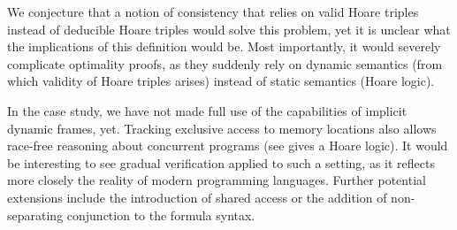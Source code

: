 We conjecture that a notion of consistency that relies on valid Hoare triples instead of deducible Hoare triples would solve this problem, yet it is unclear what the implications of this definition would be.
Most importantly, it would severely complicate optimality proofs, as they suddenly rely on dynamic semantics (from which validity of Hoare triples arises) instead of static semantics (Hoare logic).

In the case study, we have not made full use of the capabilities of implicit dynamic frames, yet.
Tracking exclusive access to memory locations also allows race-free reasoning about concurrent programs (see \cite{summers2013formal} gives a Hoare logic).
It would be interesting to see gradual verification applied to such a setting, as it reflects more closely the reality of modern programming languages.
Further potential extensions include the introduction of shared access or the addition of non-separating conjunction to the formula syntax.

